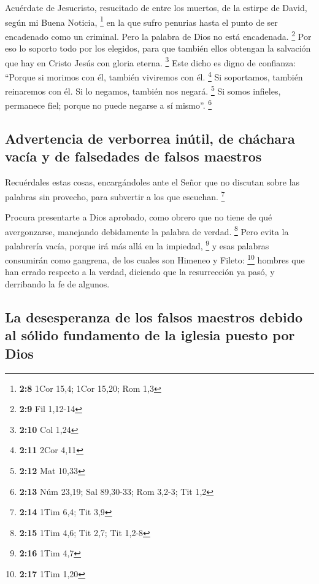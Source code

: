 \begin{paracol}{2}
 Acuérdate de Jesucristo, resucitado de entre los muertos,
de la estirpe de David, según mi Buena Noticia, \footnote{\textbf{2:8}
  1Cor 15,4; 1Cor 15,20; Rom 1,3}  en la que sufro
penurias hasta el punto de ser encadenado como un criminal. Pero la
palabra de Dios no está encadenada. \footnote{\textbf{2:9} Fil 1,12-14}
 Por eso lo soporto todo por los elegidos, para que
también ellos obtengan la salvación que hay en Cristo Jesús con gloria
eterna. \footnote{\textbf{2:10} Col 1,24}  Este dicho es
digno de confianza: ``Porque si morimos con él, también viviremos con
él. \footnote{\textbf{2:11} 2Cor 4,11}  Si soportamos,
también reinaremos con él. Si lo negamos, también nos negará.
\footnote{\textbf{2:12} Mat 10,33}  Si somos infieles,
permanece fiel; porque no puede negarse a sí mismo''. \footnote{\textbf{2:13}
  Núm 23,19; Sal 89,30-33; Rom 3,2-3; Tit 1,2}

\hypertarget{advertencia-de-verborrea-inuxfatil-de-chuxe1chara-vacuxeda-y-de-falsedades-de-falsos-maestros}{%
\subsection{Advertencia de verborrea inútil, de cháchara vacía y de
falsedades de falsos
maestros}\label{advertencia-de-verborrea-inuxfatil-de-chuxe1chara-vacuxeda-y-de-falsedades-de-falsos-maestros}}

 Recuérdales estas cosas, encargándoles ante el Señor que
no discutan sobre las palabras sin provecho, para subvertir a los que
escuchan. \footnote{\textbf{2:14} 1Tim 6,4; Tit 3,9}

 Procura presentarte a Dios aprobado, como obrero que no
tiene de qué avergonzarse, manejando debidamente la palabra de verdad.
\footnote{\textbf{2:15} 1Tim 4,6; Tit 2,7; Tit 1,2-8} 
Pero evita la palabrería vacía, porque irá más allá en la impiedad,
\footnote{\textbf{2:16} 1Tim 4,7}  y esas palabras
consumirán como gangrena, de los cuales son Himeneo y Fileto:
\footnote{\textbf{2:17} 1Tim 1,20}  hombres que han
errado respecto a la verdad, diciendo que la resurrección ya pasó, y
derribando la fe de algunos.

\hypertarget{la-desesperanza-de-los-falsos-maestros-debido-al-suxf3lido-fundamento-de-la-iglesia-puesto-por-dios}{%
\subsection{La desesperanza de los falsos maestros debido al sólido
fundamento de la iglesia puesto por
Dios}\label{la-desesperanza-de-los-falsos-maestros-debido-al-suxf3lido-fundamento-de-la-iglesia-puesto-por-dios}}


\end{paracol}
